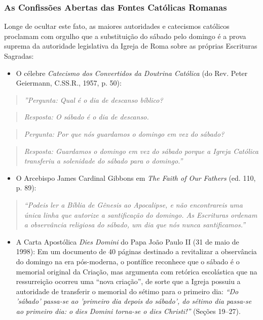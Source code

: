 \documentclass[11pt,a4paper,openany]{book}
\begin{document}
\subsubsection*{As Confissões Abertas das Fontes Católicas Romanas}
Longe de ocultar este fato, as maiores autoridades e catecismos católicos proclamam com orgulho que a substituição do sábado pelo domingo é a prova suprema da autoridade legislativa da Igreja de Roma sobre as próprias Escrituras Sagradas:
\begin{itemize}
  \item O célebre \textit{Catecismo dos Convertidos da Doutrina Católica} (do Rev. Peter Geiermann, C.SS.R., 1957, p. 50):
\end{itemize}


\begin{quote}
\itshape ''Pergunta: Qual é o dia de descanso bíblico?
\end{quote}


\begin{quote}
\itshape Resposta: O sábado é o dia de descanso.
\end{quote}


\begin{quote}
\itshape Pergunta: Por que nós guardamos o domingo em vez do sábado?
\end{quote}


\begin{quote}
\itshape Resposta: Guardamos o domingo em vez do sábado porque a Igreja Católica transferiu a solenidade do sábado para o domingo.''
\end{quote}

\begin{itemize}
  \item O Arcebispo James Cardinal Gibbons em \textit{The Faith of Our Fathers} (ed. 110, p. 89):
\end{itemize}


\begin{quote}
\itshape ``Podeis ler a Bíblia de Gênesis ao Apocalipse, e não encontrareis uma única linha que autorize a santificação do domingo. As Escrituras ordenam a observância religiosa do sábado, um dia que nós nunca santificamos.''
\end{quote}

\begin{itemize}
  \item A Carta Apostólica \textit{Dies Domini} do Papa João Paulo II (31 de maio de 1998): Em um documento de 40 páginas destinado a revitalizar a observância do domingo na era pós-moderna, o pontífice reconhece que o sábado é o memorial original da Criação, mas argumenta com retórica escolástica que na ressurreição ocorreu uma ``nova criação'', de sorte que a Igreja possuiu a autoridade de transferir o memorial do sétimo para o primeiro dia: \textit{``Do 'sábado' passa-se ao 'primeiro dia depois do sábado', do sétimo dia passa-se ao primeiro dia: o dies Domini torna-se o dies Christi!''} (Seções 19–27).
\end{itemize}
\end{document}
